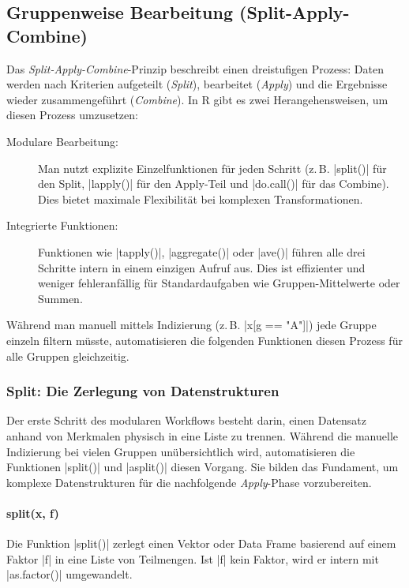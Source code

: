 \documentclass[10pt,twocolumn]{scrartcl}
\renewcommand{\lstinline}{\mycoloredinline}
\begin{document}
\subsection{Gruppenweise Bearbeitung (Split-Apply-Combine)}

Das \emph{Split-Apply-Combine}-Prinzip beschreibt einen dreistufigen Prozess: Daten werden nach Kriterien aufgeteilt (\emph{Split}), bearbeitet (\emph{Apply}) und die Ergebnisse wieder zusammengeführt (\emph{Combine}). In R gibt es zwei Herangehensweisen, um diesen Prozess umzusetzen:

\begin{description}
    \item[Modulare Bearbeitung:] Man nutzt explizite Einzelfunktionen für jeden Schritt (z.\,B. \lstinline|split()| für den Split, \lstinline|lapply()| für den Apply-Teil und \lstinline|do.call()| für das Combine). Dies bietet maximale Flexibilität bei komplexen Transformationen.
    \item[Integrierte Funktionen:] Funktionen wie \lstinline|tapply()|, \lstinline|aggregate()| oder \lstinline|ave()| führen alle drei Schritte intern in einem einzigen Aufruf aus. Dies ist effizienter und weniger fehleranfällig für Standardaufgaben wie Gruppen-Mittelwerte oder Summen.
\end{description}

Während man manuell mittels Indizierung (z.\,B. \lstinline|x[g == "A"]|) jede Gruppe einzeln filtern müsste, automatisieren die folgenden Funktionen diesen Prozess für alle Gruppen gleichzeitig.


\subsubsection{Split: Die Zerlegung von Datenstrukturen}

Der erste Schritt des modularen Workflows besteht darin, einen Datensatz anhand von Merkmalen physisch in eine Liste zu trennen. Während die manuelle Indizierung bei vielen Gruppen unübersichtlich wird, automatisieren die Funktionen \lstinline|split()| und \lstinline|asplit()| diesen Vorgang. Sie bilden das Fundament, um komplexe Datenstrukturen für die nachfolgende \emph{Apply}-Phase vorzubereiten.

\paragraph{split(x, f)}

Die Funktion \lstinline|split()| zerlegt einen Vektor oder Data Frame basierend auf einem Faktor \lstinline|f| in eine Liste von Teilmengen. Ist \lstinline|f| kein Faktor, wird er intern mit \lstinline|as.factor()| umgewandelt.
\end{document}

